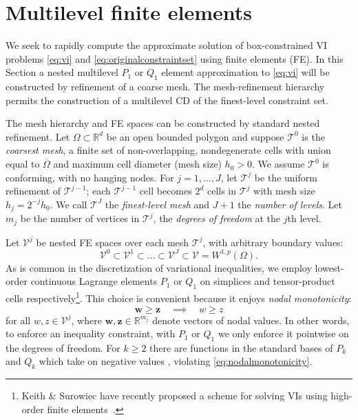 \documentclass[review,hidelinks,onefignum,onetabnum]{siamart220329}
\newcommand{\RR}{\mathbb{R}}
\newcommand{\bw}{\mathbf{w}}
\newcommand{\bz}{\mathbf{z}}
\begin{document}
\section{Multilevel finite elements} \label{sec:femultilevel}

We seek to rapidly compute the approximate solution of box-constrained VI problems \eqref{eq:vi} and \eqref{eq:originalconstraintset} using finite elements (FE).  In this Section a nested multilevel $P_1$ or $Q_1$ element \cite{Elmanetal2014} approximation to \eqref{eq:vi} will be constructed by refinement of a coarse mesh.  The mesh-refinement hierarchy permits the construction of a multilevel CD of the finest-level constraint set.

The mesh hierarchy and FE spaces can be constructed by standard nested refinement.  Let $\Omega \subset \RR^d$ be an open bounded polygon and suppose $\mathcal{T}^0$ is the \emph{coarsest mesh}, a finite set of non-overlapping, nondegenerate cells with union equal to $\overline{\Omega}$ and maximum cell diameter (mesh size) $h_0>0$.  We assume $\mathcal{T}^0$ is conforming, with no hanging nodes.  For $j=1,\dots,J$, let $\mathcal{T}^j$ be the uniform refinement of $\mathcal{T}^{j-1}$; each $\mathcal{T}^{j-1}$ cell becomes $2^d$ cells in $\mathcal{T}^j$ with mesh size $h_j = 2^{-j} h_0$.  We call $\mathcal{T}^J$ the \emph{finest-level mesh} and $J+1$ the \emph{number of levels}.  Let $m_j$ be the number of vertices in $\mathcal{T}^j$, the \emph{degrees of freedom} at the $j$th level.

Let $\mathcal{V}^j$ be nested FE spaces over each mesh $\mathcal{T}^j$, with arbitrary boundary values:
\begin{equation}
\mathcal{V}^0 \subset \mathcal{V}^1 \subset \dots \subset \mathcal{V}^J \subset \mathcal{V}=W^{1,p}(\Omega).  \label{eq:fe:nestedspaces}
\end{equation}
As is common in the discretization of variational inequalities, we employ lowest-order continuous Lagrange elements $P_1$ or $Q_1$ on simplices and tensor-product cells respectively\footnote{Keith \& Surowiec have recently proposed a scheme for solving VIs using high-order finite elements~\cite{Keith2023}.}. This choice is convenient because it enjoys \emph{nodal monotonicity}:
\begin{equation}
\bw \ge \bz \quad \implies \quad w \ge z \label{eq:nodalmonotonicity}
\end{equation}
for all $w,z \in \mathcal{V}^j$, where $\bw,\bz \in \RR^{m_j}$ denote vectors of nodal values. In other words, to enforce an inequality constraint, with $P_1$ or $Q_1$ we only enforce it pointwise on the degrees of freedom. For $k\ge 2$ there are functions in the standard bases of $P_k$ and $Q_k$ which take on negative values \cite[Figure 1.7]{Elmanetal2014}, violating \eqref{eq:nodalmonotonicity}.
\end{document}
